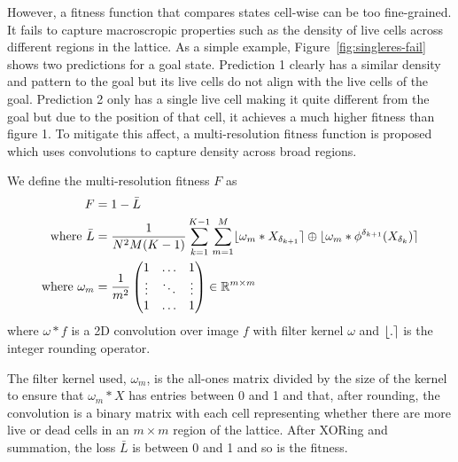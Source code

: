However, a fitness function that compares states cell-wise can be too fine-grained. It fails to capture macroscropic properties such as the density of live cells across different regions in the lattice. As a simple example, Figure~\ref{fig:singleres-fail} shows two predictions for a goal state. Prediction 1 clearly has a similar density and pattern to the goal but its live cells do not align with the live cells of the goal. Prediction 2 only has a single live cell making it quite different from the goal but due to the position of that cell, it achieves a much higher fitness than figure 1. To mitigate this affect, a multi-resolution fitness function is proposed which uses convolutions to capture density across broad regions.\\

\begin{definition}
We define the multi-resolution fitness $F$ as
\begin{align*}
    F &= 1 - \bar{L}\\
    \textnormal{where\ } \bar{L} &= \frac{1}{N^2M(K-1)} \sum_{k=1}^{K-1} \sum_{m=1}^{M} \lfloor\omega_m \ast X_{\delta_{k+1}}\rceil \oplus \lfloor\omega_m \ast \phi^{\delta_{k+1}}(X_{\delta_k})\rceil\\
    \textnormal{where\ } \omega_m &= \frac{1}{m^2}
    \begin{pmatrix}
        1 & \ldots & 1\\
        \vdots & \ddots & \vdots\\
        1 & \ldots & 1\\
    \end{pmatrix}
    \in \mathbb{R}^{m \times m}
\end{align*}
where $\omega \ast f$ is a 2D convolution over image $f$ with filter kernel $\omega$ and $\lfloor.\rceil$ is the integer rounding operator.
\end{definition}

The filter kernel used, $\omega_m$, is the all-ones matrix divided by the size of the kernel to ensure that $\omega_m \ast X$ has entries between 0 and 1 and that, after rounding, the convolution is a binary matrix with each cell representing whether there are more live or dead cells in an $m \times m$ region of the lattice. After XORing and summation, the loss $\bar{L}$ is between 0 and 1 and so is the fitness.

